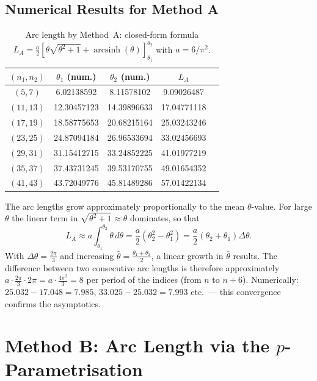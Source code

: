 \subsection{Numerical Results for Method A}

\begin{table}[H]
\centering
\caption{Arc length by Method~A: closed-form formula
  $L_A = \frac{a}{2}[\theta\sqrt{\theta^2+1}+\operatorname{arcsinh}(\theta)]_{\theta_1}^{\theta_2}$
  with $a = 6/\pi^2$.}
\renewcommand{\arraystretch}{1.2}
\begin{tabular}{ccccc}
\toprule
$(n_1, n_2)$ & $\theta_1$ (num.) & $\theta_2$ (num.) & $L_A$ \\
\midrule
$( 5,  7)$ & 6.02138592 &  8.11578102 &  9.09026487 \\
$(11, 13)$ & 12.30457123 & 14.39896633 & 17.04771118 \\
$(17, 19)$ & 18.58775653 & 20.68215164 & 25.03243246 \\
$(23, 25)$ & 24.87094184 & 26.96533694 & 33.02456693 \\
$(29, 31)$ & 31.15412715 & 33.24852225 & 41.01977219 \\
$(35, 37)$ & 37.43731245 & 39.53170755 & 49.01654352 \\
$(41, 43)$ & 43.72049776 & 45.81489286 & 57.01422134 \\
\bottomrule
\end{tabular}
\end{table}

\begin{remark}
The arc lengths grow approximately proportionally to the mean $\theta$-value.
For large $\theta$ the linear term in $\sqrt{\theta^2+1} \approx \theta$
dominates, so that
\[
  L_A \approx a\int_{\theta_1}^{\theta_2}\theta\,d\theta
  = \frac{a}{2}(\theta_2^2 - \theta_1^2)
  = \frac{a}{2}(\theta_2+\theta_1)\Delta\theta.
\]
With $\Delta\theta = \frac{2\pi}{3}$ and increasing
$\bar\theta = \frac{\theta_1+\theta_2}{2}$, a linear growth
in $\bar\theta$ results. The difference between two consecutive
arc lengths is therefore approximately
$a \cdot \frac{2\pi}{3} \cdot 2\pi = a \cdot \frac{4\pi^2}{3} = 8$ per
period of the indices (from $n$ to $n+6$). Numerically:
$25.032 - 17.048 = 7.985$, $33.025 - 25.032 = 7.993$
etc.\ --- this convergence confirms the asymptotics.
\end{remark}


\section{Method B: Arc Length via the $p$-Parametrisation}
\label{sec:methode_B}

